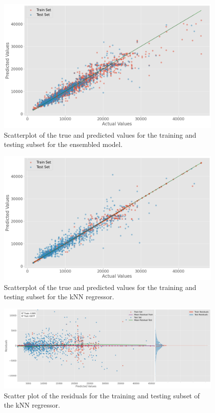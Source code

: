 \begin{figure}
    \centering
        \centering
        \includegraphics[width=\textwidth]{"content/pics/Predictionerrorplot.png"}
        \caption{Scatterplot of the true and predicted values for the training and testing subset for the ensembled model.}
        \label{fig:}
\end{figure}
\begin{figure}
    \centering
        \centering
        \includegraphics[width=\textwidth]{"content/pics/Predictionerrorplot_Knn.png"}
        \caption{Scatterplot of the true and predicted values for the training and testing subset for the kNN regressor.}
        \label{fig:}
\end{figure}
\begin{figure}
    \centering
        \centering
        \includegraphics[width=\textwidth]{"content/pics/residuals_train_test_knn.png"}
        \caption{Scatter plot of the residuals for the training and testing subset of the kNN regressor.}
        \label{fig:}
\end{figure}
